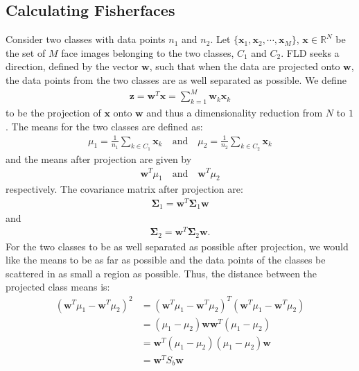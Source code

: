 \subsection{Calculating Fisherfaces}
Consider two classes with data points $n_1$ and $n_2$. Let $\lbrace \mathbf{x}_1, \mathbf{x}_2, \cdots, \mathbf{x}_M\rbrace$, $\mathbf{x}\in \mathbb{R}^N$ be the set of $M$ face images belonging to the two classes, $C_1$ and $C_2$.
FLD seeks a direction, defined by the vector $\mathbf{w}$, such that when the data are projected onto $\mathbf{w}$, the data points from the two classes are as well separated as possible.
We define \begin{align*}
\mathbf{z} = \mathbf{w}^T\mathbf{x} = \sum_{k=1}^{M}\mathbf{w}_k\mathbf{x}_k
\end{align*}
to be the projection of $\mathbf{x}$ onto $\mathbf{w}$ and thus a dimensionality reduction from $N$ to $1$. 
The means for the two classes are defined as: \begin{align*}
\mu_1 = \frac{1}{n_1}\sum_{k\in C_1}\mathbf{x}_k \quad \mathrm{and}\quad \mu_2 = \frac{1}{n_2}\sum_{k\in C_2}\mathbf{x}_k
\end{align*}
and the means after projection are given by \begin{align*}
\mathbf{w}^T\mu_1 \quad \mathrm{and} \quad \mathbf{w}^T\mu_2
\end{align*}
respectively. The covariance matrix after projection are: \begin{align*}
\mathbf{\Sigma}_1 = \mathbf{w}^T\mathbf{\Sigma}_1\mathbf{w}
\end{align*}
and \begin{align*}
\mathbf{\Sigma}_2 = \mathbf{w}^T\mathbf{\Sigma}_2\mathbf{w}.
\end{align*}
For the two classes to be as well separated as possible after projection, we would like the means to be as far as possible and the data points of the classes be scattered in as small a region as possible.
Thus, the distance between the projected class means is: \begin{align*}
\left(\mathbf{w}^T\mu_1- \mathbf{w}^T\mu_2\right)^2 &=\left(\mathbf{w}^T\mu_1-\mathbf{w}^T\mu_2\right)^T\left(\mathbf{w}^T\mu_1-\mathbf{w}^T\mu_2\right)\\
&= \left(\mu_1-\mu_2\right)\mathbf{w}\mathbf{w}^T\left(\mu_1-\mu_2\right)\\
&= \mathbf{w}^T\left(\mu_1-\mu_2\right)\left(\mu_1-\mu_2\right)\mathbf{w}\\
& = \mathbf{w}^T S_b\mathbf{w}
\end{align*}
